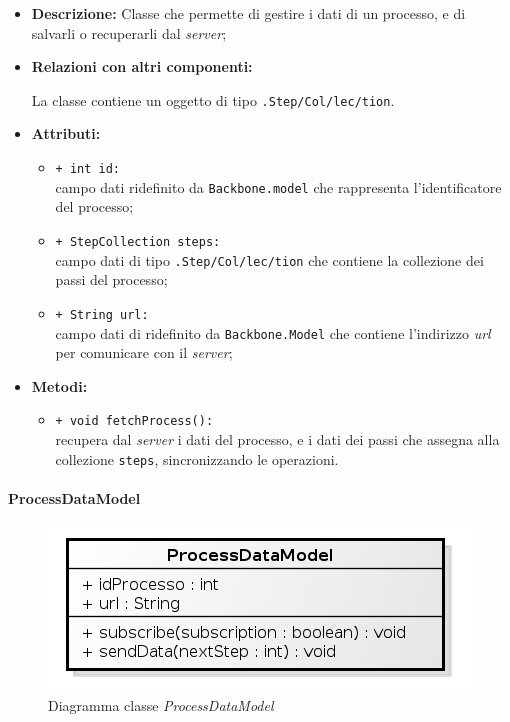 \begin{flushleft}
\begin{itemize}
\item \textbf{Descrizione:} Classe che permette di gestire i dati di un processo, e di salvarli o recuperarli dal \textit{server};
\item \textbf{Relazioni con altri componenti:}
\begin{sloppypar}
La classe contiene un oggetto di tipo \texttt{\collection{}.Step\fshyp{}Col\fshyp{}lec\fshyp{}tion}.
\end{sloppypar}
\item \textbf{Attributi:}
\begin{sloppypar}
\begin{itemize}
\item \texttt{+ int id:}\\ campo dati ridefinito da \texttt{Backbone.model} che rappresenta l'identificatore del processo;
\item \texttt{+ StepCollection steps:}\\ campo dati di tipo \texttt{\collection{}.Step\fshyp{}Col\fshyp{}lec\fshyp{}tion} che contiene la collezione dei passi del processo;
\item \texttt{+ String url:}\\ campo dati di ridefinito da \texttt{Backbone.Model} che contiene l'indirizzo \textit{url} per comunicare con il \textit{server};
\end{itemize}
\end{sloppypar}
\item \textbf{Metodi:}
\begin{sloppypar}
\begin{itemize}
\item \texttt{+ void fetchProcess():}\\ recupera dal \textit{server} i dati del processo, e i dati dei passi che assegna alla collezione \texttt{steps}, sincronizzando le operazioni.
\end{itemize}
\end{sloppypar}
\end{itemize}
\end{flushleft}

\paragraph{ProcessDataModel}
\label{processDataModel}

\begin{figure}[H] \centering \includegraphics[width=%
\textwidth]
{./classi/client/model/ProcessDataModel.png} \caption{Diagramma classe  \textit{ProcessDataModel}}
\end{figure}

